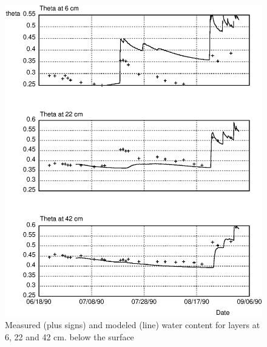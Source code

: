 \begin{figure}
\centerline{
\includegraphics{psfig/mesmod1.eps}
}
\label{fig:mesmodtheta1}
\caption{Measured (plus signs) and modeled (line) water content for layers 
at 6, 22 and 42 cm. below the surface}
\end{figure}

